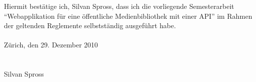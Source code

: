 Hiermit bestätige ich, Silvan Spross, dass ich die vorliegende Semesterarbeit
``Webapplikation für eine öffentliche Medienbibliothek mit einer API'' im
Rahmen der geltenden Reglemente selbstständig ausgeführt habe.\\
\\
Zürich, den 29. Dezember 2010\\
\\\\
Silvan Spross